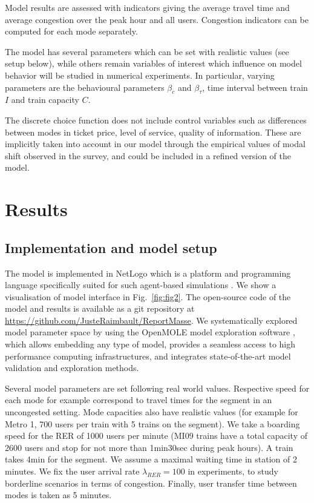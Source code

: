 \documentclass[3p,times,procedia]{elsarticle}
\begin{document}
Model results are assessed with indicators giving the average travel time and average congestion over the peak hour and all users. Congestion indicators can be computed for each mode separately.

The model has several parameters which can be set with realistic values (see setup below), while others remain variables of interest which influence on model behavior will be studied in numerical experiments. In particular, varying parameters are the behavioural parameters $\beta_c$ and $\beta_{\tau}$, time interval between train $I$ and train capacity $C$.

The discrete choice function does not include control variables such as differences between modes in ticket price, level of service, quality of information. These are implicitly taken into account in our model through the empirical values of modal shift observed in the survey, and could be included in a refined version of the model.


\section{Results}



\subsection{Implementation and model setup}


The model is implemented in NetLogo which is a platform and programming language specifically suited for such agent-based simulations \citep{tisue2004netlogo}. We show a visualisation of model interface in Fig.~\ref{fig:fig2}. The open-source code of the model and results is available as a git repository at \url{https://github.com/JusteRaimbault/ReportMasse}. We systematically explored model parameter space by using the OpenMOLE model exploration software \citep{reuillon2013openmole}, which allows embedding any type of model, provides a seamless access to high performance computing infrastructures, and integrates state-of-the-art model validation and exploration methods.

Several model parameters are set following real world values. Respective speed for each mode for example correspond to travel times for the segment in an uncongested setting. Mode capacities also have realistic values (for example for Metro 1, 700 users per train with 5 trains on the segment). We take a boarding speed for the RER of 1000 users per minute (MI09 trains have a total capacity of 2600 users and stop for not more than 1min30sec during peak hours). A train takes 4min for the segment. We assume a maximal waiting time in station of 2 minutes. We fix the user arrival rate $\lambda_{RER} = 100$ in experiments, to study borderline scenarios in terms of congestion. Finally, user transfer time between modes is taken as 5 minutes.
\end{document}
